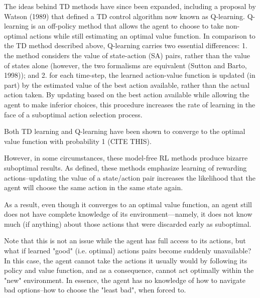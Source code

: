 \documentclass[10pt,letterpaper]{article}
\begin{document}

The ideas behind TD methods have since been expanded, including a proposal by Watson (1989) that defined a TD control algorithm now known as Q-learning. Q-learning is an off-policy method that allows the agent to choose to take non-optimal actions while still estimating an optimal value function. In comparison to the TD method described above, Q-learning carries two essential differences: 1. the method considers the value of state-action (SA) pairs, rather than the value of states alone (however, the two formalisms are equivalent (Sutton and Barto, 1998)); and 2. for each time-step, the learned action-value function is updated (in part) by the estimated value of the best action available, rather than the actual action taken. By updating based on the best action available while allowing the agent to make inferior choices, this procedure increases the rate of learning in the face of a suboptimal action selection process.

Both TD learning and Q-learning have been shown to converge to the optimal value function with probability 1 (CITE THIS). 


However, in some circumstances, these model-free RL methods 
produce bizarre suboptimal results. As defined, these methods emphasize learning of rewarding actions--updating the value of a state/action
pair increases the likelihood that the agent will choose the same action in the same state again. 

As a result, even though it converges to an optimal value function, an agent still does not have complete knowledge of its environment---namely, it does not know much (if anything) about those actions that were discarded early as suboptimal. 

Note that this is not an issue while the agent has full access to its actions, but what if learned "good" (i.e. optimal) actions pairs become suddenly unavailable? In this case, the agent cannot take the actions it usually would by following its policy and value function, and as a consequence, cannot act optimally within the "new" environment. In essence, the agent has no knowledge of how to navigate bad options--how to choose the "least bad", when forced to.
\end{document}
